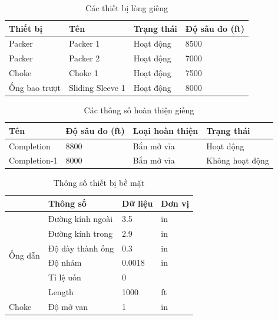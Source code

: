 \documentclass[12pt,a4paper]{report}
\begin{document}
\begin{table}[h]
\caption{Các thiết bị lòng giếng}\label{tab:downhole_equipment}
\begin{tabularx}{\textwidth}{@{}XXXX@{}}
\toprule
Thiết bị      & Tên              & Trạng thái & Độ sâu đo (ft) \\ \midrule
Packer        & Packer 1         & Hoạt động  & 8500           \\
Packer        & Packer 2         & Hoạt động  & 7000           \\
Choke         & Choke 1          & Hoạt động  & 7500           \\
Ống bao trượt & Sliding Sleeve 1 & Hoạt động  & 8000           \\ \bottomrule
\end{tabularx}
\end{table}

\clearpage

\begin{table}[h]
\caption{Các thông số hoàn thiện giếng}\label{tab:well_completion}
\begin{tabularx}{\textwidth}{@{}XXXX@{}}
\toprule
Tên          & Độ sâu đo (ft) & Loại hoàn thiện & Trạng thái \\ \midrule
Completion   & 8800           & Bắn mở vỉa      & Hoạt động  \\
Completion-1 & 8000           & Bắn mở vỉa      & Không hoạt động  \\ \bottomrule
\end{tabularx}
\end{table}

\begin{table}[h]
\caption{Thông số thiết bị bề mặt}\label{tab:surface_equipment}
\begin{tabularx}{\textwidth}{@{}XXXX@{}}
\toprule
                         & Thông số         & Dữ liệu & Đơn vị \\ \midrule
\multirow{6}{*}{Ống dẫn} & Đường kính ngoài & 3.5     & in     \\
                         & Đường kính trong & 2.9     & in     \\
                         & Độ dày thành ống & 0.3     & in     \\
                         & Độ nhám          & 0.0018  & in     \\
                         & Tỉ lệ uốn        & 0       &        \\
                         & Length           & 1000    & ft     \\
Choke                    & Độ mở van        & 1       & in     \\ \bottomrule
\end{tabularx}
\end{table}
\end{document}
